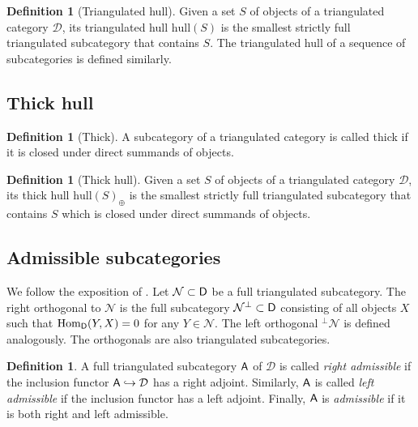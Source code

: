 \documentclass[sn-mathphys-num]{sn-jnl}%
\newcommand{\N}{\mathcal N}
\newcommand{\D}{\mathcal D}
\newcommand{\hull}{{\mathrm{hull}}}
\newcommand*{\Hom}{\mathop{\mathrm {Hom}}\nolimits}
\newcommand{\sd}{\sf D}
\newcommand{\A}{{\sf A}}
\theoremstyle{definition}
\newtheorem{definition}[theorem]{Definition}%
\begin{document}
\begin{definition}[Triangulated hull]
Given a set $S$ of objects of
a triangulated category $\mathcal D$, its triangulated hull $\hull(S)$ is the smallest strictly full triangulated subcategory that contains $S$.
The triangulated hull of a sequence of subcategories is defined similarly.
\end{definition}

\subsection{Thick hull }
\begin{definition}[Thick]A subcategory  of
a triangulated category is called thick if it is closed under direct summands of objects.
\end{definition}

\begin{definition}[Thick hull]
Given a  set $S$ of objects of
a triangulated category $\mathcal D$, its thick hull $\hull(S)_{\oplus}$ is the smallest strictly full triangulated subcategory that contains $S$ which is closed under direct summands of objects.
\end{definition}


\subsection{Admissible subcategories}\label{subsec:amdsubcat}

We follow the exposition of  \cite[Section 2.1]{Ef}.
Let $\N\subset \sd$ be a full triangulated subcategory. The right orthogonal to $\N$ is the full subcategory $\N ^{\perp}\subset \sd $ consisting of all objects $X$ such that $\Hom _{\sd}(Y,X)=0$ for any $Y\in \N$. The left orthogonal $^{\perp}\N$ is defined analogously. The orthogonals are also triangulated subcategories.


\begin{definition}\label{def:admissible}
{A full triangulated subcategory $\A$ of $\D$ is called
{\it right admissible} if the inclusion functor $\A\hookrightarrow \D$ has a right adjoint. Similarly, $\A$ is called {\it left
  admissible} if the inclusion functor has a left adjoint. Finally,
$\A$ is {\it admissible} if it is both right and
left admissible.}
\end{definition}
\end{document}
